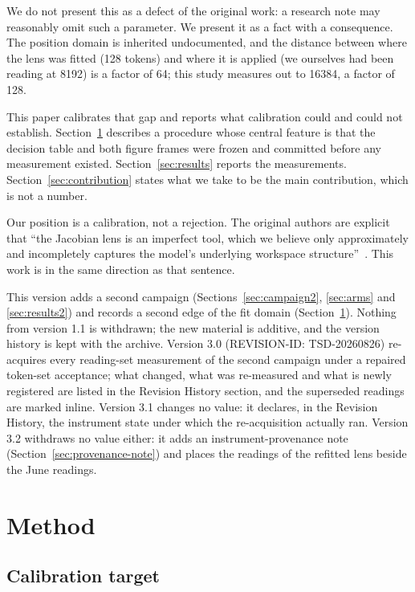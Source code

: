 \documentclass[11pt]{article}
\begin{document}
We do not present this as a defect of the original work: a research note
may reasonably omit such a parameter. We present it as a fact with a
consequence. The position domain is inherited undocumented, and the
distance between where the lens was fitted (128 tokens) and where it is
applied (we ourselves had been reading at 8192) is a factor of 64; this
study measures out to 16384, a factor of 128.

This paper calibrates that gap and reports what calibration could and
could not establish. Section~\ref{sec:method} describes a procedure whose
central feature is that the decision table and both figure frames were
frozen and committed before any measurement existed.
Section~\ref{sec:results} reports the measurements.
Section~\ref{sec:contribution} states what we take to be the main
contribution, which is not a number.

Our position is a calibration, not a rejection. The original authors are
explicit that ``the Jacobian lens is an imperfect tool, which we believe
only approximately and incompletely captures the model's underlying
workspace structure''~\cite{gurnee2026workspace}. This work is in the
same direction as that sentence.

This version adds a second campaign (Sections~\ref{sec:campaign2}, \ref{sec:arms} and \ref{sec:results2}) and records a second edge of the fit domain (Section~\ref{sec:method}). Nothing from version 1.1 is withdrawn; the new material is additive, and the version history is kept with the archive. Version 3.0 (REVISION-ID: TSD-20260826) re-acquires every reading-set measurement of the second campaign under a repaired token-set acceptance; what changed, what was re-measured and what is newly registered are listed in the Revision History section, and the superseded readings are marked inline. Version 3.1 changes no value: it declares, in the Revision History, the instrument state under which the re-acquisition actually ran. Version 3.2 withdraws no value either: it adds an instrument-provenance note (Section~\ref{sec:provenance-note}) and places the readings of the refitted lens beside the June readings.

\section{Method}
\label{sec:method}

\subsection{Calibration target}
\end{document}
